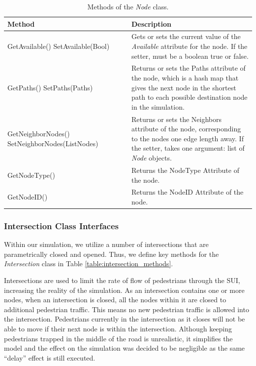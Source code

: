 \documentclass[12pt]{article}
\begin{document}
\def\arraystretch{1.5}
\begin{table}
  \centering
    \begin{tabular}{p{0.5\linewidth}p{0.5\linewidth}}
     \hline
     Method & Description \\
     \hline
     GetAvailable() \newline SetAvailable(Bool)  & Gets or sets the current
                        value of the \textit{Available} attribute for the node.
                        If the setter, must be a boolean true or false. \\
     GetPaths() \newline SetPaths(Paths) & Returns or sets the Paths attribute
                of the node, which is a hash map that gives the next node in
                the shortest path to each possible destination node in the
                simulation. \\
     GetNeighborNodes() \newline SetNeighborNodes(ListNodes) & Returns or sets
                        the Neighbors attribute of the node, corresponding to
                        the nodes one edge length away. If the setter, takes
                        one argument: list of \textit{Node} objects. \\
     GetNodeType() & Returns the NodeType Attribute of the node. \\
     GetNodeID() & Returns the NodeID Attribute of the node. \\
     \hline
    \end{tabular}
    \caption{Methods of the \textit{Node} class.}
  \label{table:node_methods}
\end{table}

\subsubsection{Intersection Class Interfaces}
Within our simulation, we utilize a number of intersections that are
parametrically closed and opened. Thus, we define key methods for the
\textit{Intersection} class in Table \ref{table:intersection_methods}.

Intersections are used to limit the rate of flow of pedestrians through the SUI,
increasing the reality of the simulation. As an intersection contains one or
more nodes, when an intersection is closed, all the nodes within it are
closed to additional pedestrian traffic. This means no new pedestrian traffic is
allowed into the intersection.  Pedestrians currently in the intersection as it
closes will not be able to move if their next node is within the intersection.
Although keeping pedestrians trapped in the middle of the road is unrealistic,
it simplifies the model and the effect on the simulation was decided to be
negligible as the same ``delay'' effect is still executed.
\end{document}
